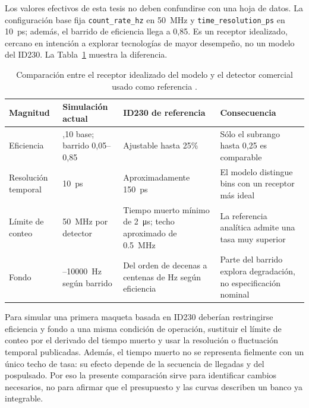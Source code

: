 Los valores efectivos de esta tesis no deben confundirse con una hoja de datos. La configuración base fija \texttt{count\_rate\_hz} en \SI{50}{\mega\hertz} y \texttt{time\_resolution\_ps} en \SI{10}{\pico\second}; además, el barrido de eficiencia llega a 0,85. Es un receptor idealizado, cercano en intención a explorar tecnologías de mayor desempeño, no un modelo del ID230. La Tabla~\ref{tab:modelo_id230} muestra la diferencia.

\begin{table}[H]
  \centering
  \small
  \begin{tabularx}{\textwidth}{
    >{\raggedright\arraybackslash}p{}
    >{\raggedright\arraybackslash}p{}
    >{\raggedright\arraybackslash}p{}
    >{\raggedright\arraybackslash}X}
    \toprule
    Magnitud & Simulación actual & ID230 de referencia & Consecuencia \\
    \midrule
    Eficiencia & 0,10 base; barrido 0,05--0,85 & Ajustable hasta 25\% & Sólo el subrango hasta 0,25 es comparable \\
    Resolución temporal & \SI{10}{\pico\second} & Aproximadamente \SI{150}{\pico\second} & El modelo distingue bins con un receptor más ideal \\
    Límite de conteo & \SI{50}{\mega\hertz} por detector & Tiempo muerto mínimo de \SI{2}{\micro\second}; techo aproximado de \SI{0.5}{\mega\hertz} & La referencia analítica admite una tasa muy superior \\
    Fondo & 80--\SI{10000}{\hertz} según barrido & Del orden de decenas a centenas de Hz según eficiencia & Parte del barrido explora degradación, no especificación nominal \\
    \bottomrule
  \end{tabularx}
  \caption{Comparación entre el receptor idealizado del modelo y el detector comercial usado como referencia \cite{idqID230}.}
  \label{tab:modelo_id230}
\end{table}

Para simular una primera maqueta basada en ID230 deberían restringirse eficiencia y fondo a una misma condición de operación, sustituir el límite de conteo por el derivado del tiempo muerto y usar la resolución o fluctuación temporal publicadas. Además, el tiempo muerto no se representa fielmente con un único techo de tasa: su efecto depende de la secuencia de llegadas y del pospulsado. Por eso la presente comparación sirve para identificar cambios necesarios, no para afirmar que el presupuesto y las curvas describen un banco ya integrable.

